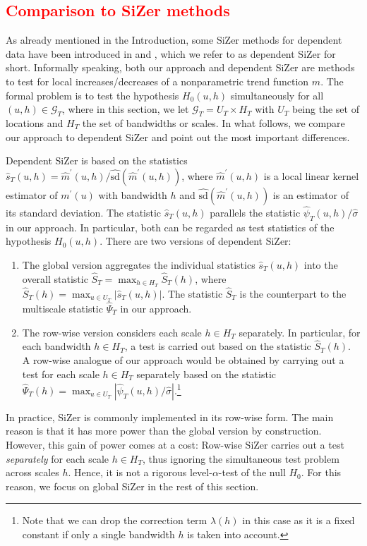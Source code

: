 \subsection{\textcolor{red}{Comparison to SiZer methods}}\label{subsec-method-comparison} 


As already mentioned in the Introduction, some SiZer methods for dependent data have been introduced in \cite{Rondonotti2004} and \cite{Rondonotti2007}, which we refer to as dependent SiZer for short. Informally speaking, both our approach and dependent SiZer are methods to test for local increases/decreases of a nonparametric trend function $m$. The formal problem is to test the hypothesis $H_0(u,h)$ simultaneously for all $(u,h) \in \mathcal{G}_T$, where in this section, we let $\mathcal{G}_T = U_T \times H_T$ with $U_T$ being the set of locations and $H_T$ the set of bandwidths or scales. In what follows, we compare our approach to dependent SiZer and point out the most important differences. 


Dependent SiZer is based on the statistics $\widehat{s}_T(u,h) = \widehat{m}^\prime(u,h)/\widehat{\text{sd}}(\widehat{m}^\prime(u,h))$, where $\widehat{m}^\prime(u,h)$ is a local linear kernel estimator of $m^\prime(u)$ with bandwidth $h$ and $\widehat{\text{sd}}(\widehat{m}^\prime(u,h))$ is an estimator of its standard deviation. The statistic $\widehat{s}_T(u,h)$ parallels the statistic $\widehat{\psi}_T(u,h)/\widehat{\sigma}$ in our approach. In particular, both can be regarded as test statistics of the hypothesis $H_0(u,h)$. There are two versions of dependent SiZer: 
\begin{enumerate}[label=(\alph*), leftmargin=0.75cm]

\item The global version aggregates the individual statistics $\widehat{s}_T(u,h)$ into the overall statistic $\widehat{S}_T = \max_{h \in H_T} \widehat{S}_T(h)$, where $\widehat{S}_T(h) = \max_{u \in U_T} |\widehat{s}_T(u,h)|$. The statistic $\widehat{S}_T$ is the counterpart to the multiscale statistic $\widehat{\Psi}_T$ in our approach. 

\item The row-wise version considers each scale $h \in H_T$ separately. In particular, for each bandwidth $h \in H_T$, a test is carried out based on the statistic $\widehat{S}_T(h)$. A row-wise analogue of our approach would be obtained by carrying out a test for each scale $h \in H_T$ separately based on the statistic $\widehat{\Psi}_T(h) = \max_{u \in U_T} |\widehat{\psi}_T(u,h)/\widehat{\sigma}|$.\footnote{Note that we can drop the correction term $\lambda(h)$ in this case as it is a fixed constant if only a single bandwidth $h$ is taken into account.}

\end{enumerate}
In practice, SiZer is commonly implemented in its row-wise form. The main reason is that it has more power than the global version by construction. However, this gain of power comes at a cost: Row-wise SiZer carries out a test \textit{separately} for each scale $h \in H_T$, thus ignoring the simultaneous test problem across scales $h$. Hence, it is not a rigorous level-$\alpha$-test of the null $H_0$. For this reason, we focus on global SiZer in the rest of this section. 


